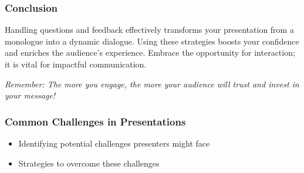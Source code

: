 \documentclass[aspectratio=169]{beamer}
\begin{document}
\begin{frame}[fragile]
    \frametitle{Conclusion}
    Handling questions and feedback effectively transforms your presentation from a monologue into a dynamic dialogue. Using these strategies boosts your confidence and enriches the audience’s experience. 
    Embrace the opportunity for interaction; it is vital for impactful communication.
    
    \textit{Remember: The more you engage, the more your audience will trust and invest in your message!}
\end{frame}

\begin{frame}[fragile]
    \frametitle{Common Challenges in Presentations}
    \begin{itemize}
        \item Identifying potential challenges presenters might face
        \item Strategies to overcome these challenges
    \end{itemize}
\end{frame}
\end{document}

